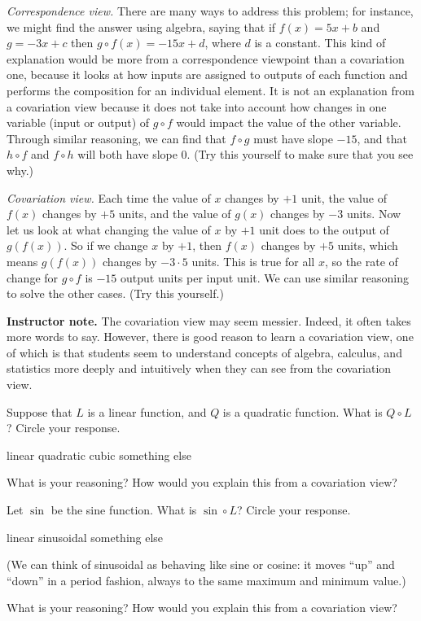 \documentclass[11pt]{article}
\newcommand\smallnote[1]
	{\begin{mdframed}\raggedright  {\bf Instructor note.} {#1} \end{mdframed}}
\newenvironment{task}
	{\begin{mdframed}[linecolor=lightgray, linewidth=3pt]\raggedright}
	{\end{mdframed}}
\theoremstyle{definition}
\begin{document}
{\it Correspondence view.} There are many ways to address this problem; for instance, we might find the answer using algebra, saying that if $f(x)=5x+b$ and $g=-3x+c$ then $g\circ f(x)=-15x+d$, where $d$ is a constant. This kind of explanation would be more from a correspondence viewpoint than a covariation one, because it looks at how inputs are assigned to outputs of each function and performs the composition for an individual element. It is not an explanation from a covariation view because it does not take into account how changes in one variable (input or output) of $g\circ f$ would impact the value of the other variable.  
Through similar reasoning, we can find that $f\circ g$ must have slope $-15$, and that $h\circ f$ and $f\circ h$ will both have slope $0$. (Try this yourself to make sure that you see why.)

{\it Covariation view.} Each time the value of $x$ changes by $+1$ unit, the value of $f(x)$ changes by $+5$ units, and the value of $g(x)$ changes by $-3$ units. Now let us look at what changing the value of $x$ by $+1$ unit does to the output of $g(f(x))$. So if we change $x$ by $+1$, then $f(x)$ changes by $+5$ units, which means $g(f(x))$ changes by $-3\cdot 5$ units. This is true for all $x$, so the rate of change for $g\circ f$ is $-15$ output units per input unit. 
We can use similar reasoning to solve the other cases. (Try this yourself.)

\smallnote{The covariation view may seem messier. Indeed, it often takes more words to say. However, there is good reason to learn a covariation view, one of which is that students seem to understand concepts of algebra, calculus, and statistics more deeply and intuitively when they can see from the covariation view.}

\begin{task}
Suppose that $L$ is a linear function, and $Q$ is a quadratic function.  What is $Q\circ L$? Circle your response.

\vspace*{-12pt}
\begin{center}
linear \quad\quad quadratic \quad\quad cubic \quad\quad something else
\end{center}

\vspace*{-12pt}
What is your reasoning? How would you explain this from a covariation view?

Let $\sin$ be the sine function. What is $\sin\circ L$? Circle your response.

\vspace*{-12pt}
\begin{center}
linear \quad\quad sinusoidal \quad\quad something else
\end{center}
\vspace*{-12pt}

(We can think of sinusoidal as behaving like sine or cosine: it moves ``up'' and ``down'' in a period fashion, always to the same maximum and minimum value.)

What is your reasoning? How would you explain this from a covariation view?

\end{task}
\end{document}
